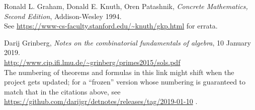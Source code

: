\documentclass[paper=a4, fontsize=12pt]{scrartcl} %
\theoremstyle{plainsl}
\theoremstyle{definition}
\theoremstyle{remark}
\begin{document}
\begin{thebibliography}{99999999}                                                                                         %


Ronald L. Graham, Donald E. Knuth, Oren Patashnik,
\textit{Concrete Mathematics, Second Edition}, Addison-Wesley 1994.\\
See \url{https://www-cs-faculty.stanford.edu/~knuth/gkp.html} for errata.

Darij Grinberg,
\textit{Notes on the combinatorial fundamentals of algebra},
10 January 2019. \\
\url{http://www.cip.ifi.lmu.de/~grinberg/primes2015/sols.pdf}
\\
The numbering of theorems and formulas in this link might shift
when the project gets updated; for a ``frozen'' version whose
numbering is guaranteed to match that in the citations above, see
\url{https://github.com/darijgr/detnotes/releases/tag/2019-01-10} .

\end{thebibliography}
\end{document}
